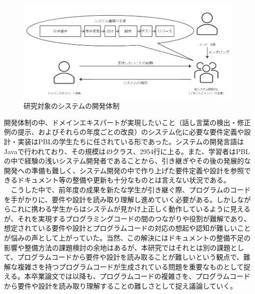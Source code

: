 \documentclass[12pt, a4paper]{jreport}
\begin{document}
\begin{figure}[H]
\centering
\includegraphics[width=0.75\linewidth]{image/taisyou1.1.png}
\caption{研究対象のシステムの開発体制}
\label{fig:enter-label}
\end{figure}
開発体制の中、ドメインエキスパートが実現したいこと（話し言葉の検出・修正例の提示、およびそれらの年度ごとの改良）のシステム化に必要な要件定義や設計・実装はPBLの学生たちに任されている形であった。システムの開発言語はJavaで行われており、その規模は49クラス、2954行に上る。また、学習者はPBL の中で経験の浅いシステム開発者であることから、引き継ぎやその後の発展的な開発への準備も難しく、システム開発の中で作り上げた要件定義や設計を参照できるドキュメント等の整備や更新も十分なものとは言えない状況である。
\\　こうした中で、前年度の成果を新たな学生が引き継ぐ際、プログラムのコードを手がかりに、要件や設計を読み取り理解し進めていく必要がある。しかしながらこれに携わる学生からはシステムが見かけ上正しく動作しているように見えるが、それを実現するプログラミングコードの間のつながりや役割が難解であり、想定されている要件や設計とプログラムコードの対応の想起や認知が難しいことが悩みの声として上がっていた。当然、この解決にはドキュメントの整備不足の影響や整備方法の課題検討の余地はあるが、本研究ではそれとは別の課題として、プログラムコードから要件や設計を読み取ることが難しいという観点で、難解な複雑さを持つプログラムコードが生成されている問題を重要なものとして捉える。本卒業論文では以降も、プログラムコードの複雑さを、プログラムコードから要件や設計を読み取り理解することの難しさとして捉え議論していく。
\end{document}
